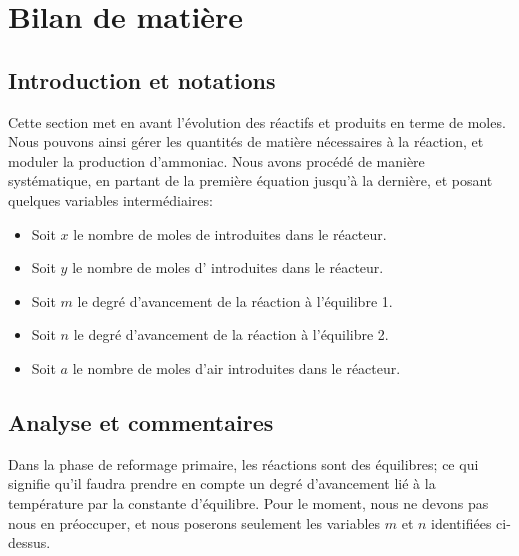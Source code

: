 \documentclass{article}
\begin{document}
\section*{Bilan de matière}

\subsection*{Introduction et notations}

Cette section met en avant l'évolution des réactifs et produits en terme de moles. 
Nous pouvons ainsi gérer les quantités de matière nécessaires à la réaction, et moduler la production d'ammoniac.
Nous avons procédé de manière systématique, en partant de la première équation jusqu'à la dernière, et posant quelques 
variables intermédiaires:

\begin{itemize}
	\item Soit $x$ le nombre de moles de  introduites dans le réacteur.
	\item Soit $y$ le nombre de moles d'  introduites dans le réacteur.
	\item Soit $m$ le degré d'avancement de la réaction à l'équilibre 1.
	\item Soit $n$ le degré d'avancement de la réaction à l'équilibre 2.
	\item Soit $a$ le nombre de moles d'air introduites dans le réacteur.
\end{itemize}

\subsection*{Analyse et commentaires}
Dans la phase de reformage primaire, les réactions sont des équilibres; ce qui signifie qu'il faudra prendre en 
compte un degré d'avancement lié à la température par la constante d'équilibre. Pour le moment, nous ne devons pas 
nous en préoccuper, et nous poserons seulement les variables $m$ et $n$ identifiées ci-dessus. 
\end{document}
